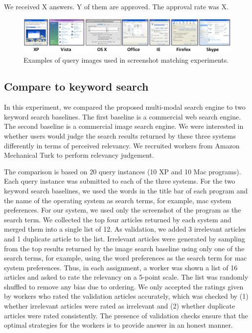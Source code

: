 \documentclass{www2010-submission}
\begin{document}
We received X answers. Y of them are approved. The approval rate
was X.

\begin{figure}
\includegraphics[width=2\columnwidth]{figure/query_examples.png}
\caption{Examples of query images used in screenshot matching
experiments.}
\label{fig:query_examples}
\end{figure}


\subsection{Compare to keyword search}

In this experiment, we compared the proposed multi-modal search engine
to two keyword search baselines. The first baseline is a commercial
web search engine.  The second baseline is a commercial image search
engine. We were interested in whether users would judge the search
results returned by these three systems differently in terms of
perceived relevancy. We recruited workers from Amazon Mechanical Turk
to perform relevancy judgement.

The comparison is based on 20 query instances (10 XP and 10 Mac
programs). Each query instance was submitted to each of the three
systems. For the two keyword search baselines, we used the words in
the title bar of each program and the name of the operating system as
search terms, for example, mac system preferences. For our system, we
used only the screenshot of the program as the search term. We
collected the top four articles returned by each system and merged
them into a single list of 12. As validation, we added 3 irrelevant
articles and 1 duplicate article to the list. Irrelevant articles were
generated by sampling from the top results returned by the image
search baseline using only one of the search terms, for example, using
the word preferences as the search term for mac system
preferences. Thus, in each assignment, a worker was shown a list of 16
articles and asked to rate the relevancy on a 5-point scale. The list
was randomly shuffled to remove any bias due to ordering.  We only
accepted the ratings given by workers who rated the validation
articles accurately, which was checked by (1) whether irrelevant
articles were rated as irrelevant and (2) whether duplicate articles
were rated consistently. The presence of validation checks
ensure that the optimal strategies for the workers is to
provide answer in an honest manner.
\end{document}
